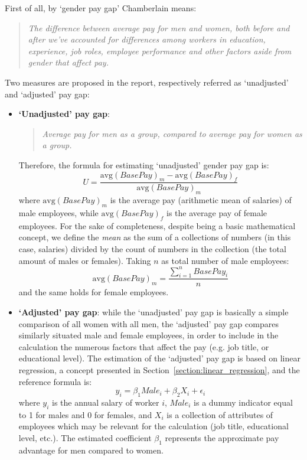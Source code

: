 First of all, by `gender pay gap' Chamberlain means:
\begin{quote}\emph{The difference between average pay for men and women, both before and after we've accounted for differences among workers in education, experience, job roles, employee performance and other factors aside from gender that affect pay.} \cite[p.~3]{chamberlain2017analyze}\end{quote}
Two measures are proposed in the report, respectively referred as `unadjusted' and `adjusted' pay gap:
\begin{itemize}
\item \textbf{`Unadjusted' pay gap}:
\begin{quote}\emph{Average pay for men as a group, compared to average pay for women as a group.} \cite[p.~3]{chamberlain2017analyze}\end{quote}
Therefore, the formula for estimating `unadjusted' gender pay gap is: \[U = \frac{\mathrm{avg}(BasePay)_m - \mathrm{avg}(BasePay)_f}{\mathrm{avg}(BasePay)_m}\] where \(\mathrm{avg}(BasePay)_m\) is the average pay (arithmetic mean of salaries) of male employees, while \(\mathrm{avg}(BasePay)_f\) is the average pay of female employees.
For the sake of completeness, despite being a basic mathematical concept, we define the \textit{mean} as the sum of a collections of numbers (in this case, salaries) divided by the count of numbers in the collection (the total amount of males or females). Taking \(n\) as total number of male employees: \[\mathrm{avg}(BasePay)_m = \frac{\sum\limits_{i=1}^n BasePay_i}{n}\] and the same holds for female employees.
\item \textbf{`Adjusted' pay gap}: while the `unadjusted' pay gap is basically a simple comparison of all women with all men, the `adjusted' pay gap compares similarly situated male and female employees, in order to include in the calculation the numerous factors that affect the pay (e.g. job title, or educational level). The estimation of the `adjusted' pay gap is based on linear regression, a concept presented in Section~\ref{section:linear_regression}, and the reference formula is: \[y_i = \beta_1\textit{Male}_i + \beta_2X_i + \epsilon_i\] where \(y_i\) is the annual salary of worker \(i\), \(\textit{Male}_i\) is a dummy indicator equal to 1 for males and 0 for females, and \(X_i\) is a collection of attributes of employees which may be relevant for the calculation (job title, educational level, etc.). The estimated coefficient \(\beta_1\) represents the approximate pay advantage for men compared to women.
\end{itemize}



